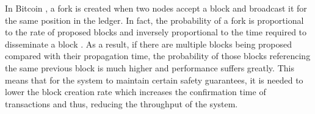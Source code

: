 In Bitcoin \cite{bitcoin}, a fork is created when two nodes accept a block and broadcast it for the same position in the ledger. In fact, the probability of a fork is proportional to the rate of proposed blocks and inversely proportional to the time required to disseminate a block \cite{bitcoin_info_network_propagation}. As a result, if there are multiple blocks being proposed compared with their propagation time, the probability of those blocks referencing the same previous block is much higher and performance suffers greatly. This means that for the system to maintain certain safety guarantees, it is needed to lower the block creation rate which increases the confirmation time of transactions and thus, reducing the throughput of the system.


